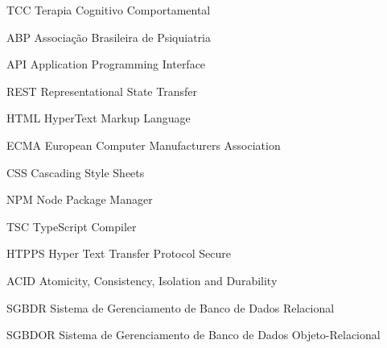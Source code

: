 \begin{siglas}
    \item[TCC] Terapia Cognitivo Comportamental
    \item[ABP] Associação Brasileira de Psiquiatria 
    \item[API] Application Programming Interface
    \item[REST] Representational State Transfer
    \item[HTML] HyperText Markup Language
    \item[ECMA] European Computer Manufacturers Association
    \item[CSS] Cascading Style Sheets 
    \item[NPM] Node Package Manager
    \item[TSC] TypeScript Compiler
    \item[HTPPS] Hyper Text Transfer Protocol Secure
    \item[ACID] Atomicity, Consistency, Isolation and Durability
    \item[SGBDR] Sistema de Gerenciamento de Banco de Dados Relacional   
    \item[SGBDOR] Sistema de Gerenciamento de Banco de Dados Objeto-Relacional   
\end{siglas}
